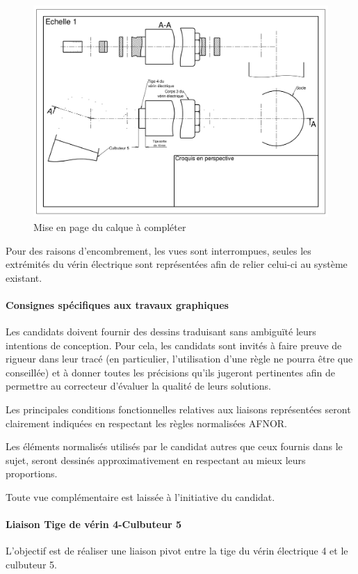 \begin{figure}[!h]
\centering\includegraphics[width=0.6\linewidth]{img/fig13}
 \caption{Mise en page du calque à compléter}
 \label{img13}
\end{figure}

Pour des raisons d’encombrement, les vues sont interrompues, seules les extrémités du vérin électrique sont représentées afin de relier celui-ci au système existant.

\paragraph{Consignes spécifiques aux travaux graphiques}

Les candidats doivent fournir des dessins traduisant sans ambiguïté leurs intentions de conception. Pour cela, les candidats sont invités à faire preuve de rigueur dans leur tracé (en particulier, l’utilisation d’une règle ne pourra être que conseillée) et à donner toutes les
précisions qu’ils jugeront pertinentes afin de permettre au correcteur d’évaluer la qualité de leurs solutions.

Les principales conditions fonctionnelles relatives aux liaisons représentées seront clairement indiquées en respectant les règles normalisées AFNOR.

Les éléments normalisés utilisés par le candidat autres que ceux fournis dans le sujet, seront dessinés approximativement en respectant au mieux leurs proportions.

Toute vue complémentaire est laissée à l’initiative du candidat.

\paragraph{Liaison Tige de vérin 4-Culbuteur 5}

L’objectif est de réaliser une liaison pivot entre la tige du vérin électrique 4 et le culbuteur 5.

